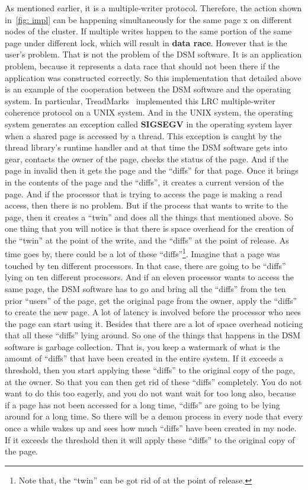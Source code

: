 \documentclass[11pt]{lecture}
\begin{document}
As mentioned earlier, it is a multiple-writer protocol. Therefore, the action shown in~\autoref{fig: impl} can be happening 
simultaneously for the same page {\code x} on different nodes of the cluster. If multiple writes happen to 
the same portion of the same page under different lock, which will result in {\bf data race}. However that is 
the user's problem. That is not the problem of the DSM software. It is an application problem, because it represents 
a data race that should not been there if the application was constructed correctly. So this implementation 
that detailed above is an example of the cooperation between the DSM software and the operating system. 
In particular, TreadMarks~\cite{Amza1996DSM} implemented this LRC multiple-writer coherence protocol 
on a UNIX system. And in the UNIX system, the operating system generates an exception called {\bf SIGSEGV} in the 
operating system layer when a shared page is accessed by a thread. This exception is caught by the 
thread library's runtime handler and at that time the DSM software gets into gear, contacts the owner of the page, 
checks the status of the page. And if the page in invalid then it gets the page and 
the ``diffs'' for that page. Once it brings in the contents of the page and the ``diffs'', it creates a current 
version of the page. And if the processor that is trying to access the page is making a read access, then 
there is no problem. But if the process that wants to write to the page, then it creates a ``twin'' and does 
all the things that mentioned above. So one thing that you will notice is that there is space overhead for the 
creation of the ``twin'' at the point of the write, and the ``diffs'' at the point of release. As time goes by, 
there could be a lot of these ``diffs''\footnote{Note that, the ``twin'' can be got rid of at the point of release.}. 
Imagine that a page was touched by ten different processors. In that case, there are going to be ``diffs'' 
lying on ten different processors. And if an eleven processor wants to access the same page, the DSM software 
has to go and bring all the ``diffs'' from the ten prior ``users'' of the page, get the original page from 
the owner, apply the ``diffs'' to create the new page. A lot of latency is involved before the processor who 
nees the page can start using it. Besides that there are a lot of space overhead noticing that 
all these ``diffs'' lying around. So one of the things that happens in the DSM software is garbage collection. 
That is, you keep a watermark of what is the amount of ``diffs'' that have been created in the 
entire system. If it exceeds a threshold, then you start applying these ``diffs'' to the original copy 
of the page, at the owner. So that you can then get rid of these ``diffs'' completely. You do not want to 
do this too eagerly, and you do not want wait for too long also, because if a page has not been accessed 
for a long time, ``diffs'' are going to be lying around for a long time. So there will be a demon process 
in every node that every once a while wakes up and sees how much ``diffs'' have been created in my node. If it exceeds 
the threshold then it will apply these ``diffs'' to the original copy of the page. 
\end{document}

